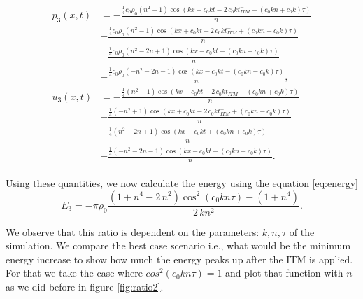 \begin{align}
    \begin{split}
        p_3\left(x, t\right) & = -\frac{{\frac{1}{4}c_{0}\rho_{0}\left( n^{2} + 1\right)} \cos\left(k x + c_{0} k t - 2 \, c_{0} k \mathit{t_{ITM}^-} - {\left(c_{0} k n + c_{0} k\right)} \tau\right)}{n} \\
        & - \frac{{\frac{1}{4}c_0\rho_0\left(n^{2} - 1\right)} \cos\left(k x + c_{0} k t - 2 \, c_{0} k \mathit{t_{ITM}^-} + {\left(c_{0} k n - c_{0} k\right)} \tau\right)}{n} \\
        & - \frac{{\frac{1}{4}c_0\rho_0\left(n^{2} - 2n + 1\right)} \cos\left(kx -c_{0} k t + {\left(c_{0} k n + c_{0} k\right)} \tau\right)}{n} \\
        & - \frac{{\frac{1}{4}c_0\rho_0\left(-n^{2} - 2n - 1\right)} \cos\left(kx-c_{0} k t - {\left(c_{0} k n - c_{0} k\right)} \tau\right)}{n}, \\
        u_3\left(x, t\right) & =  -\frac{{\frac{1}{4}\left(n^{2} - 1\right)} \cos\left( k x + c_{0} k t - 2 \, c_{0} k \mathit{t_{ITM}^-} - {\left(c_{0} k n + c_{0} k\right)} \tau\right)}{n} \\
        & - \frac{{\frac{1}{4}\left(-n^{2} + 1\right)} \cos\left(kx + c_{0} k t - 2 \, c_{0} k \mathit{t_{ITM}^-} + {\left(c_{0} k n - c_{0} k\right)} \tau\right)}{n} \\
        & - \frac{{\frac{1}{4}\left(n^{2} - 2n + 1\right)} \cos\left(kx -c_{0} k t + {\left(c_{0} k n + c_{0} k\right)} \tau\right)}{n} \\
        & - \frac{{\frac{1}{4}\left(-n^{2} - 2n - 1\right)} \cos\left(kx -c_{0} k t - {\left(c_{0} k n - c_{0} k\right)} \tau\right)}{n} .
    \end{split}
\end{align}

Using these quantities, we now calculate the energy using the equation \ref{eq:energy}
\begin{equation}
    E_3 = -\pi \rho_0\frac{{\left(1 + n^{4} - 2 \, n^{2}\right)} \cos^{2}\left(c_{0} k n \tau\right) - {\left(1 + n^{4}\right)}}{2 \, k n^{2}}.
\end{equation}

We observe that this ratio is dependent on the parameters: $k,n,\tau$ of the simulation. We compare the best case scenario i.e., what would be the minimum energy increase to show how much the energy peaks up after the ITM is applied. For that we take the case where $cos^2\left(c_0kn\tau\right)=1$ and plot that function with $n$ as we did before in figure \ref{fig:ratio2}.

